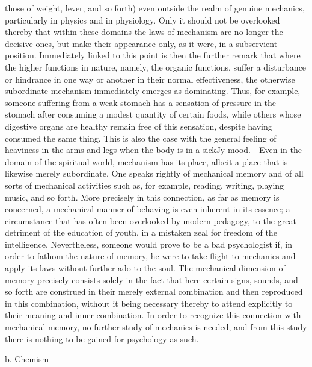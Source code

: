 those of weight, lever, and so forth) even outside the realm of genuine mechanics,
particularly in physics and in physiology. Only it should not be overlooked thereby
that within these domains the laws of mechanism are no longer the decisive ones,
but make their appearance only, as it were, in a subservient position. Immediately
linked to this point is then the further remark that where the higher functions in
nature, namely, the organic functions, suffer a disturbance or hindrance in one
way or another in their normal effectiveness, the otherwise subordinate mechanism
immediately emerges as dominating. Thus, for example, someone suffering from
a weak stomach has a sensation of pressure in the stomach after consuming a
modest quantity of certain foods, while others whose digestive organs are healthy
remain free of this sensation, despite having consumed the same thing. This is
also the case with the general feeling of heaviness in the arms and legs when
the body is in a sickJy mood. - Even in the domain of the spiritual world,
mechanism has its place, albeit a place that is likewise merely subordinate. One
speaks rightly of mechanical memory and of all sorts of mechanical activities such
as, for example, reading, writing, playing music, and so forth. More precisely in
this connection, as far as memory is concerned, a mechanical manner of behaving
is even inherent in its essence; a circumstance that has often been overlooked
by modern pedagogy, to the great detriment of the education of youth, in a
mistaken zeal for freedom of the intelligence. Nevertheless, someone would prove
to be a bad psychologist if, in order to fathom the nature of memory, he were
to take flight to mechanics and apply its laws without further ado to the soul.
The mechanical dimension of memory precisely consists solely in the fact that
here certain signs, sounds, and so forth are construed in their merely external
combination and then reproduced in this combination, without it being necessary
thereby to attend explicitly to their meaning and inner combination. In order to
recognize this connection with mechanical memory, no further study of mechanics
is needed, and from this study there is nothing to be gained for psychology
as such.

b. Chemism

